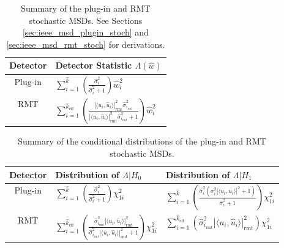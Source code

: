 \begin{table*}[ht!]
\centering
\begin{tabular}{cl}\toprule
 Detector & Detector Statistic $\Lambda(\widehat{w})$  \\
\midrule
Plug-in & $\sum_{i=1}^{\widehat{k}}\left(\frac{\widehat{\sigma}_i^2}{\widehat{\sigma}_i^2+1}\right)\widehat{w}_i^2$ \\
 RMT & $\sum_{i=1}^{\widehat{k}_{\text{eff}}}\left(\frac{|\langle u_i,\widehat{u}_i\rangle|^2_{\text{rmt}}\widehat{\sigma}_{i_\text{rmt}}^2}{|\langle u_i,\widehat{u}_i\rangle|^2_{\text{rmt}}\widehat{\sigma}_{i_\text{rmt}}^2+1 }\right)\widehat{w}_i^2$ \\
\bottomrule
\end{tabular}
\caption{Summary of the plug-in and RMT stochastic MSDs. See Sections \ref{sec:ieee_msd_plugin_stoch} and \ref{sec:ieee_msd_rmt_stoch} for derivations.}\vskip-0.2cm
\label{table:summary_stoch}
\end{table*}

\begin{table*}[ht!]
\centering
\begin{tabular}{cll}\toprule
 Detector & Distribution  of $\Lambda|H_0$ & Distribution of $\Lambda|H_1$\\
\midrule
Plug-in &$\sum_{i=1}^{\widehat{k}}\left(\frac{\widehat{\sigma}_i^2}{\widehat{\sigma}_i^2+1}\right)\chi^2_{1i}$ & $\sum_{i=1}^{\widehat{k}}\left(\frac{\widehat{\sigma}_i^2\left(\sigma^2_i|\langle u_i,\widehat{u}_i\rangle|^2+1\right)}{\widehat{\sigma}_i^2+1}\right)\chi^2_{1i}$\\
 RMT  & $\sum_{i=1}^{\widehat{k}_{\text{eff}}}\left(\frac{\widehat{\sigma}_{i_\text{rmt}}^2|\langle u_i,\widehat{u}_i\rangle|^2_{\text{rmt}}}{\widehat{\sigma}_{i_\text{rmt}}^2|\langle u_i,\widehat{u}_i\rangle|^2_{\text{rmt}}+1}\right)\chi^2_{1i}$ & $\sum_{i=1}^{\widehat{k}_{\text{eff}}}\left(\widehat{\sigma}^2_{i_\text{rmt}}|\langle u_i,\widehat{u}_i\rangle|^2_{\text{rmt}}\right)\chi^2_{1i}$\\
\bottomrule
\end{tabular}
\caption{Summary of the conditional distributions of the plug-in and RMT stochastic MSDs.}\vskip-0.2cm
\label{table:summary_stoch2}
\end{table*}


